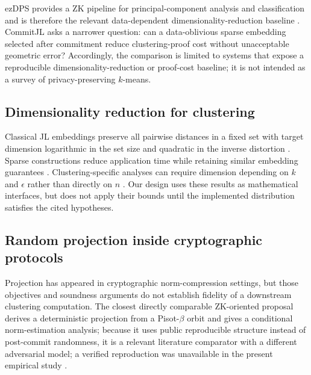 \documentclass[pdflatex,sn-mathphys-num,iicol]{sn-jnl}
\newcommand{\tpexplain}[1]{}
\theoremstyle{plain}
\theoremstyle{definition}
\theoremstyle{remark}
\begin{document}
ezDPS provides a ZK pipeline for principal-component analysis and classification and is therefore the relevant data-dependent dimensionality-reduction baseline \cite{ezdps2023}. CommitJL asks a narrower question: can a data-oblivious sparse embedding selected after commitment reduce clustering-proof cost without unacceptable geometric error? Accordingly, the comparison is limited to systems that expose a reproducible dimensionality-reduction or proof-cost baseline; it is not intended as a survey of privacy-preserving $k$-means.

\subsection{Dimensionality reduction for clustering}
\tpexplain{One paragraph on classical JL, one on clustering-specific projection dimensions. State theorem parameters accurately and separate pairwise preservation from objective preservation.}
Classical JL embeddings preserve all pairwise distances in a fixed set with target dimension logarithmic in the set size and quadratic in the inverse distortion \cite{johnson1984extensions}. Sparse constructions reduce application time while retaining similar embedding guarantees \cite{kane2014sparser}. Clustering-specific analyses can require dimension depending on $k$ and $\epsilon$ rather than directly on $n$ \cite{cohen2015dimensionality,makarychev2019performance}. Our design uses these results as mathematical interfaces, but does not apply their bounds until the implemented distribution satisfies the cited hypotheses.

\subsection{Random projection inside cryptographic protocols}
\tpexplain{Clarify that projection is not itself novel in cryptography. Contrast its role in norm compression with proof-cost-aware ML compression.}
Projection has appeared in cryptographic norm-compression settings, but those objectives and soundness arguments do not establish fidelity of a downstream clustering computation. The closest directly comparable ZK-oriented proposal derives a deterministic projection from a Pisot-$\beta$ orbit and gives a conditional norm-estimation analysis; because it uses public reproducible structure instead of post-commit randomness, it is a relevant literature comparator with a different adversarial model; a verified reproduction was unavailable in the present empirical study \cite{dey2026pisot}.
\end{document}
